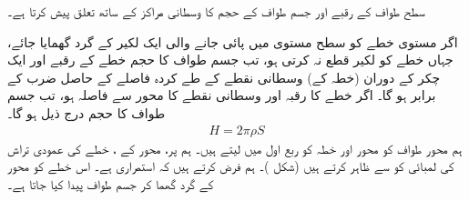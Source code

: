 سطح طواف کے رقبے  اور جسم طواف کے حجم کا وسطانی مراکز کے  ساتھ تعلق   پیش کرتا ہے۔

اگر   مستوی خطے  کو سطح مستوی میں پائی جانے والی ایک   لکیر کے گرد گھمایا جائے،  جہاں خطے کو لکیر قطع نہ کرتی ہو،  تب جسم طواف کا حجم
خطے کے رقبے اور ایک چکر کے دوران  (خطہ کے)  وسطانی نقطے کے طے کردہ فاصلے کے حاصل ضرب  کے برابر ہو گا۔ اگر خطے کا رقبہ  اور وسطانی نقطے کا محور سے فاصلہ  ہو،  تب جسم طواف کا حجم درج ذیل ہو گا۔ 
\begin{align}\label{مساوات_تکمل_استعمال_مسئلہ_پاپس_الف}
H=2\pi \rho S
\end{align}
ہم محور طواف کو محور   اور خطہ  کو ربع اول میں لیتے ہیں۔ ہم  پر، محور  کے ، خطے  کی  عمودی تراش کی لمبائی کو  سے ظاہر کرتے ہیں (شکل )۔ ہم فرض کرتے ہیں کہ  استمراری ہے۔ اس خطے  کو محور  کے گرد گھما کر جسم طواف پیدا کیا جاتا ہے۔

